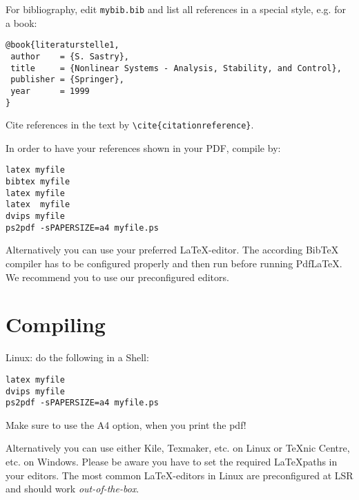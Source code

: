 For bibliography, edit {\tt mybib.bib} and list all
references in a special style, e.g. for a book: 
\begin{verbatim}
@book{literaturstelle1,
 author    = {S. Sastry},
 title     = {Nonlinear Systems - Analysis, Stability, and Control},
 publisher = {Springer},
 year      = 1999
}
\end{verbatim}

Cite references in the text by \verb|\cite{citationreference}|.

In order to have your references shown in your PDF, compile by:

\begin{verbatim} 
latex myfile
bibtex myfile
latex myfile
latex  myfile
dvips myfile
ps2pdf -sPAPERSIZE=a4 myfile.ps
\end{verbatim}

Alternatively you can use your preferred \LaTeX -editor. The according BibTeX compiler has to be configured properly and then run before running PdfLaTeX. We recommend you to use our preconfigured editors.

\section{Compiling}
Linux: 
do the following in a Shell:\\
\begin{verbatim}
latex myfile
dvips myfile
ps2pdf -sPAPERSIZE=a4 myfile.ps
\end{verbatim}
Make sure to use the A4 option, when you print the pdf!

Alternatively you can use either Kile, Texmaker, etc. on Linux or TeXnic Centre, etc. on Windows. Please be aware you have to set the required \LaTeX paths in your editors. The most common \LaTeX -editors in Linux are preconfigured at LSR and should work \emph{out-of-the-box}.




